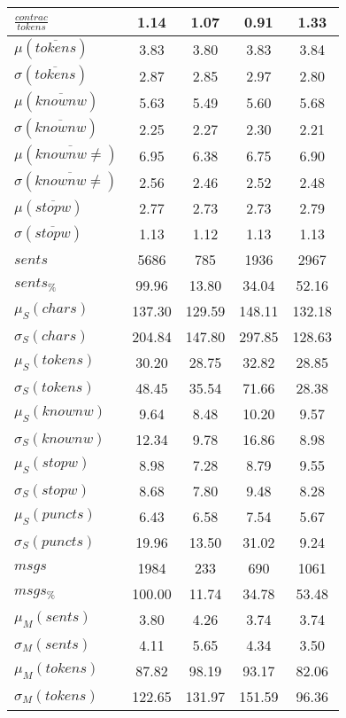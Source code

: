 \begin{table}[h!]
\begin{center}
\begin{tabular}{| l || c | c | c | c |}
$\frac{contrac}{tokens}$ & 1.14  & 1.07  & 0.91  & 1.33 \\\hline\hline
$\mu(\overline{tokens})$ & 3.83  & 3.80  & 3.83  & 3.84 \\
$\sigma(\overline{tokens})$ & 2.87  & 2.85  & 2.97  & 2.80 \\\hline
$\mu(\overline{knownw})$ & 5.63  & 5.49  & 5.60  & 5.68 \\
$\sigma(\overline{knownw})$ & 2.25  & 2.27  & 2.30  & 2.21 \\\hline
$\mu(\overline{knownw \neq})$ & 6.95  & 6.38  & 6.75  & 6.90 \\
$\sigma(\overline{knownw \neq})$ & 2.56  & 2.46  & 2.52  & 2.48 \\\hline
$\mu(\overline{stopw})$ & 2.77  & 2.73  & 2.73  & 2.79 \\
$\sigma(\overline{stopw})$ & 1.13  & 1.12  & 1.13  & 1.13 \\\hline\hline
$sents$ & 5686  & 785  & 1936  & 2967 \\
$sents_{\%}$ & 99.96  & 13.80  & 34.04  & 52.16 \\\hline
$\mu_S(chars)$ & 137.30  & 129.59  & 148.11  & 132.18 \\
$\sigma_S(chars)$ & 204.84  & 147.80  & 297.85  & 128.63 \\\hline
$\mu_S(tokens)$ & 30.20  & 28.75  & 32.82  & 28.85 \\
$\sigma_S(tokens)$ & 48.45  & 35.54  & 71.66  & 28.38 \\\hline
$\mu_S(knownw)$ & 9.64  & 8.48  & 10.20  & 9.57 \\
$\sigma_S(knownw)$ & 12.34  & 9.78  & 16.86  & 8.98 \\\hline
$\mu_S(stopw)$ & 8.98  & 7.28  & 8.79  & 9.55 \\
$\sigma_S(stopw)$ & 8.68  & 7.80  & 9.48  & 8.28 \\\hline
$\mu_S(puncts)$ & 6.43  & 6.58  & 7.54  & 5.67 \\
$\sigma_S(puncts)$ & 19.96  & 13.50  & 31.02  & 9.24 \\\hline\hline
$msgs$ & 1984  & 233  & 690  & 1061 \\
$msgs_{\%}$ & 100.00  & 11.74  & 34.78  & 53.48 \\\hline
$\mu_M(sents)$ & 3.80  & 4.26  & 3.74  & 3.74 \\
$\sigma_M(sents)$ & 4.11  & 5.65  & 4.34  & 3.50 \\\hline
$\mu_M(tokens)$ & 87.82  & 98.19  & 93.17  & 82.06 \\
$\sigma_M(tokens)$ & 122.65  & 131.97  & 151.59  & 96.36 \\\hline

\end{tabular}
\end{center}
\end{table}

